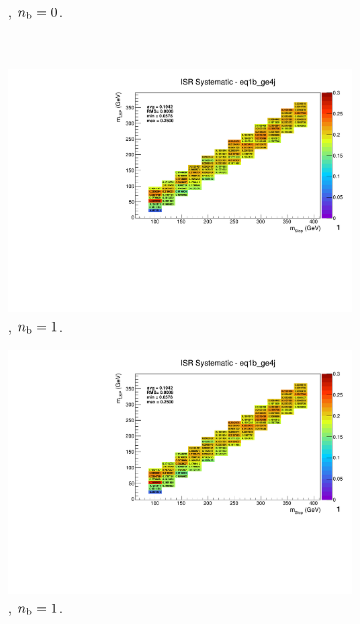 \begin{figure}[ht!]
\begin{subfigure}[b]{0.32\textwidth}
    \caption{\njhigh, $n_{\text{b}} = 0$.}
  \end{subfigure}\\
  \begin{subfigure}[b]{0.32\textwidth}
    \includegraphics[width=\textwidth, page=12]{Figs/sms/t2degen/v19_2/systs/T2_4body_ISR_eq1b_ge4j.pdf}
    \caption{\njhigh, $n_{\text{b}} = 1$.}
  \end{subfigure}
  \begin{subfigure}[b]{0.32\textwidth}
    \includegraphics[width=\textwidth, page=8]{Figs/sms/t2degen/v19_2/systs/T2_4body_ISR_eq1b_ge4j.pdf}
    \caption{\njhigh, $n_{\text{b}} = 1$.}
  \end{subfigure}
  \begin{subfigure}[b]{0.32\textwidth}

\end{subfigure}
\end{figure}
